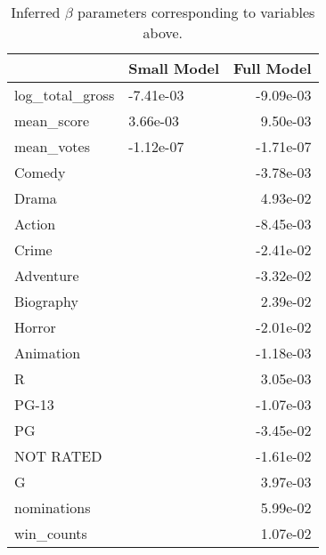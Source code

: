 \begin{table}
\centering
\caption{Inferred $\beta$ parameters corresponding to variables above.}
\begin{tabular}{llr}
\toprule
                 & Small Model &  Full Model \\
\midrule
 log\_total\_gross &   -7.41e-03 &   -9.09e-03 \\
      mean\_score &    3.66e-03 &    9.50e-03 \\
      mean\_votes &   -1.12e-07 &   -1.71e-07 \\
          Comedy &             &   -3.78e-03 \\
           Drama &             &    4.93e-02 \\
          Action &             &   -8.45e-03 \\
           Crime &             &   -2.41e-02 \\
       Adventure &             &   -3.32e-02 \\
       Biography &             &    2.39e-02 \\
          Horror &             &   -2.01e-02 \\
       Animation &             &   -1.18e-03 \\
               R &             &    3.05e-03 \\
           PG-13 &             &   -1.07e-03 \\
              PG &             &   -3.45e-02 \\
       NOT RATED &             &   -1.61e-02 \\
               G &             &    3.97e-03 \\
     nominations &             &    5.99e-02 \\
      win\_counts &             &    1.07e-02 \\
\bottomrule
\end{tabular}
\end{table}
